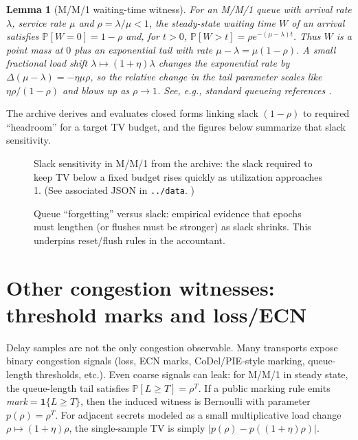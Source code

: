 \documentclass[11pt]{article}
\newtheorem{lemma}{Lemma}
\theoremstyle{definition}
\theoremstyle{remark}
\newcommand{\Prb}{\mathbb{P}}
\begin{document}
\begin{lemma}[M/M/1 waiting-time witness]\label{lem:mm1}
For an M/M/1 queue with arrival rate $\lambda$, service rate $\mu$ and $\rho=\lambda/\mu<1$, the steady-state waiting time $W$ of an arrival satisfies
$\Prb[W=0]=1-\rho$ and, for $t>0$, $\Prb[W>t]=\rho e^{-(\mu-\lambda)t}$.
Thus $W$ is a point mass at $0$ plus an exponential tail with rate $\mu-\lambda=\mu(1-\rho)$.
A small fractional load shift $\lambda\mapsto (1+\eta)\lambda$ changes the exponential rate by
$\Delta(\mu-\lambda)= -\eta\mu\rho$, so the \emph{relative} change in the tail parameter scales like $\eta\rho/(1-\rho)$ and blows up as $\rho\to 1$.
See, e.g., standard queueing references \cite{kendall1953,asmussen2003}.
\end{lemma}

The archive derives and evaluates closed forms linking slack $(1-\rho)$ to required ``headroom'' for a target TV budget, and the figures below summarize that slack sensitivity.

\begin{figure}[t]
\centering
{}
\caption{Slack sensitivity in M/M/1 from the archive: the slack required to keep TV below a fixed budget rises quickly as utilization approaches 1.
(See associated JSON in \texttt{../data}. )}
\label{fig:mm1slack}
\end{figure}

\begin{figure}[t]
\centering
{}
\caption{Queue ``forgetting'' versus slack: empirical evidence that epochs must lengthen (or flushes must be stronger) as slack shrinks.
This underpins reset/flush rules in the accountant.}
\label{fig:forgetting}
\end{figure}

\section{Other congestion witnesses: threshold marks and loss/ECN}
Delay samples are not the only congestion observable.
Many transports expose binary congestion signals (loss, ECN marks, CoDel/PIE-style marking, queue-length thresholds, etc.).
Even coarse signals can leak: for M/M/1 in steady state, the queue-length tail satisfies $\Prb[L\ge T]=\rho^T$.
If a public marking rule emits \emph{mark}$=\mathbf{1}\{L\ge T\}$, then the induced witness is Bernoulli with parameter $p(\rho)=\rho^T$.
For adjacent secrets modeled as a small multiplicative load change $\rho\mapsto (1+\eta)\rho$, the single-sample TV is simply $|p(\rho)-p((1+\eta)\rho)|$.
\end{document}
